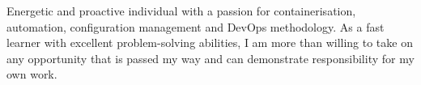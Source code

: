 

\begin{cvparagraph}

Energetic and proactive individual with a passion for containerisation, automation, configuration management and DevOps methodology. As a fast learner with excellent problem-solving abilities, I am more than willing to take on any opportunity that is passed my way and can demonstrate responsibility for my own work.
\end{cvparagraph}
